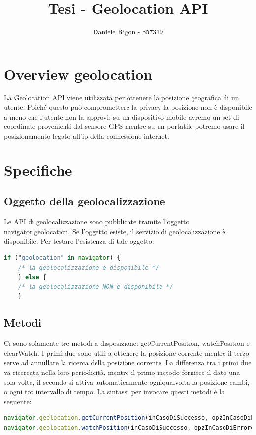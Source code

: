 \documentclass[italian]{article}
\author{
	Daniele Rigon - 857319 \\
}
\begin{document}
	
\title{Tesi - Geolocation API}
\maketitle

\tableofcontents
\pagebreak


\section{Overview geolocation}
La Geolocation API viene utilizzata per ottenere la posizione geografica di un utente. 
Poiché questo può compromettere la privacy la posizione non è disponibile a meno che l'utente non la approvi: su un dispositivo mobile avremo un set di coordinate provenienti dal sensore GPS mentre su un portatile potremo usare il posizionamento legato all’ip della connessione internet.

\section{Specifiche}

\subsection{Oggetto della geolocalizzazione}
Le API di geolocalizzazione sono pubblicate tramite l'oggetto navigator.geolocation. Se l'oggetto esiste, il servizio di geolocalizzazione è disponibile. Per testare l'esistenza di tale oggetto:
\begin{lstlisting}[language=JavaScript]
	if ("geolocation" in navigator) {
	/* la geolocalizzazione e disponibile */
	} else {
	/* la geolocalizzazione NON e disponibile */
	}
\end{lstlisting}

\subsection{Metodi}
Ci sono solamente tre metodi a disposizione: getCurrentPosition, watchPosition e clearWatch. I primi due sono utili a ottenere la posizione corrente mentre il terzo serve ad annullare la ricerca della posizione corrente. 
La differenza tra i primi due va ricercata nella loro periodicità, mentre il primo metodo fornisce il dato una sola volta, il secondo si attiva automaticamente ogniqualvolta la posizione cambi, o ogni tot intervallo di tempo.
La sintassi per invocare questi metodi è la seguente:
\begin{lstlisting}[language=JavaScript]
navigator.geolocation.getCurrentPosition(inCasoDiSuccesso, opzInCasoDiErrore, opzioni); 
navigator.geolocation.watchPosition(inCasoDiSuccesso, opzInCasoDiErrore, opzioni);
\end{lstlisting}
\end{document}
